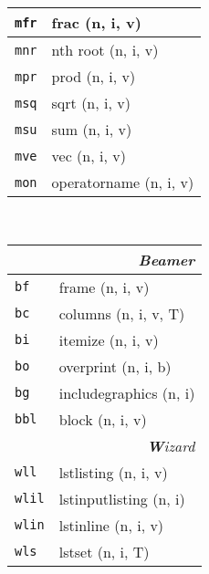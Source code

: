 \documentclass[oneside,10pt,landscape,DIV16]{scrartcl}
\newcommand{\Map}[1] {\textbf{\textasciiacute}\texttt{#1}}
\begin{document}
\begin{multicols}{3}
\begin{center}
\begin{tabular}[]{|p{11mm}|p{62mm}|}
\hline  \Map{mfr} & frac                      \hfill (n, i, v)\\
\hline  \Map{mnr} & nth root                  \hfill (n, i, v)\\
\hline  \Map{mpr} & prod                      \hfill (n, i, v)\\
\hline  \Map{msq} & sqrt                      \hfill (n, i, v)\\
\hline  \Map{msu} & sum                       \hfill (n, i, v)\\
\hline  \Map{mve} & vec                       \hfill (n, i, v)\\
\hline  \Map{mon} & operatorname              \hfill (n, i, v)\\
\hline
%
\end{tabular}\\
%
\newpage
%
\begin{tabular}[]{|p{11mm}|p{60mm}|}
\hline
\multicolumn{2}{|r|}{\textsl{B\textbf{e}amer}}\\[1.0ex]
\hline \Map{bf}  & frame           \hfill (n, i, v)\\
\hline \Map{bc}  & columns         \hfill (n, i, v, T)\\
\hline \Map{bi}  & itemize         \hfill (n, i, v)\\
\hline \Map{bo}  & overprint       \hfill (n, i, b)\\
\hline \Map{bg}  & includegraphics \hfill (n, i)\\
\hline \Map{bbl} & block           \hfill (n, i, v)\\
\hline
\hline
\multicolumn{2}{|r|}{\textsl{\textbf{W}izard}}\\[1.0ex]
\hline  \Map{wll}  & lstlisting               \hfill (n, i, v)\\
\hline  \Map{wlil} & lstinputlisting          \hfill (n, i)\\
\hline  \Map{wlin} & lstinline                \hfill (n, i, v)\\
\hline  \Map{wls}  & lstset                   \hfill (n, i, T)\\

\end{tabular}
\end{center}
\end{multicols}
\end{document}
